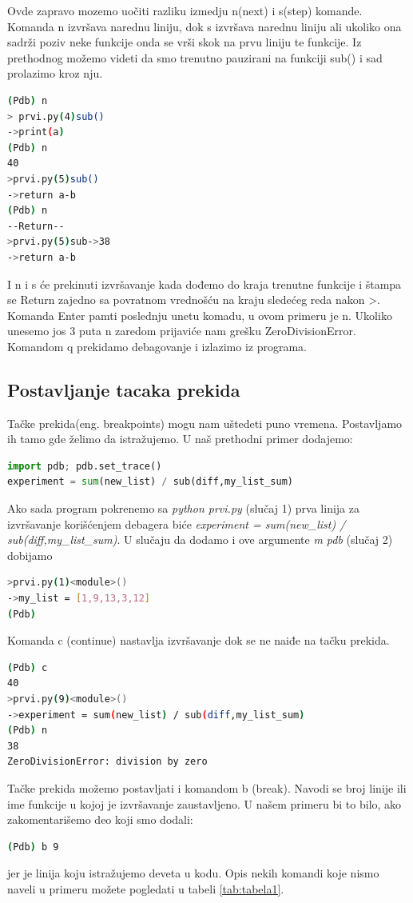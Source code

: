 \documentclass[a4paper]{article}
\begin{document}
Ovde zapravo mozemo uočiti razliku izmedju n(next) i s(step) komande. Komanda n izvršava narednu liniju, dok s izvršava narednu liniju ali ukoliko ona sadrži poziv neke funkcije onda se vrši skok na prvu liniju te funkcije. Iz prethodnog možemo videti da smo trenutno pauzirani na funkciji sub() i sad prolazimo kroz nju.
\begin{lstlisting}[language = bash, caption={Izvršavamo prve tri linije u funkciji \emph{sub(40, 2)}}]
(Pdb) n
> prvi.py(4)sub()
->print(a)
(Pdb) n
40
>prvi.py(5)sub()
->return a-b
(Pdb) n
--Return--
>prvi.py(5)sub->38
->return a-b
\end{lstlisting}
I n i s će prekinuti izvršavanje kada dođemo do kraja trenutne funkcije i štampa se \textendash \textendash Return \textendash\textendash zajedno sa povratnom vrednošću na kraju sledećeg reda nakon \textendash>. Komanda Enter pamti poslednju unetu komadu, u ovom primeru je n. Ukoliko unesemo jos 3 puta n zaredom prijaviće nam grešku ZeroDivisionError. Komandom q prekidamo debagovanje i izlazimo iz programa.
\subsection{Postavljanje tacaka prekida}
Tačke prekida(eng. breakpoints) mogu nam uštedeti puno vremena. Postavljamo ih tamo gde želimo da istražujemo. U naš prethodni primer dodajemo:
\begin{lstlisting}[language = python, caption = {U primer prvi.py na ovom mestu dodata prva linija}]
import pdb; pdb.set_trace()
experiment = sum(new_list) / sub(diff,my_list_sum)
\end{lstlisting}
Ako sada program pokrenemo sa \emph{python prvi.py} (slučaj 1) prva linija za izvršavanje korišćenjem debagera biće \emph{experiment = sum(new\_list) / sub(diff,my\_list\_sum)}. U slučaju da dodamo i ove argumente \emph{\textendash m  pdb} (slučaj 2) dobijamo
\begin{lstlisting}[language = bash, caption={U slučaju 2 izvršavanje kreće od prve linije}]
>prvi.py(1)<module>()
->my_list = [1,9,13,3,12]
(Pdb)
\end{lstlisting}
Komanda c (continue) nastavlja izvršavanje dok se ne naiđe na tačku prekida.
\begin{lstlisting}[language = bash, caption={Nastavlja se izvršavanje do tačke prekida i izvršava sledeću liniju}]
(Pdb) c
40
>prvi.py(9)<module>()
->experiment = sum(new_list) / sub(diff,my_list_sum)
(Pdb) n
38
ZeroDivisionError: division by zero
\end{lstlisting}
Tačke prekida možemo postavljati i komandom b (break). Navodi se broj linije ili ime funkcije u kojoj je izvršavanje zaustavljeno. U našem primeru bi to bilo, ako zakomentarišemo deo koji smo dodali:
\begin{lstlisting}[language = bash, caption={Na liniji 9 postavljamo tačku prekida}]
(Pdb) b 9 
\end{lstlisting}
jer je linija koju istražujemo deveta u kodu.
Opis nekih komandi koje nismo naveli u primeru možete pogledati u tabeli \ref{tab:tabela1}.
\end{document}
